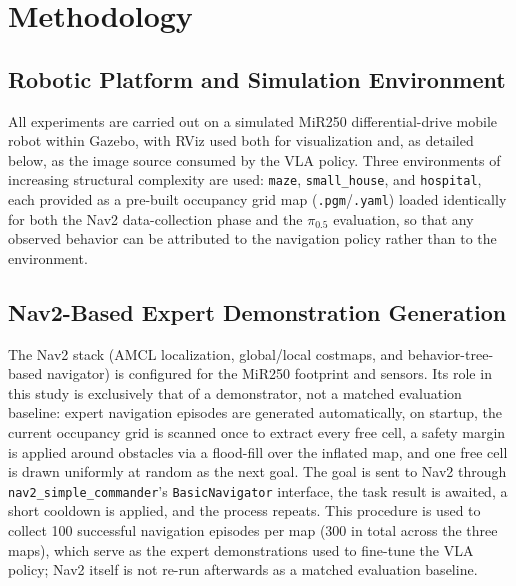 \documentclass[conference]{IEEEtran}
\begin{document}
\section{Methodology}

\subsection{Robotic Platform and Simulation Environment}
All experiments are carried out on a simulated MiR250 differential-drive mobile robot within Gazebo, with RViz used both for visualization and, as detailed below, as the image source consumed by the VLA policy. Three environments of increasing structural complexity are used: \texttt{maze}, \texttt{small\_house}, and \texttt{hospital}, each provided as a pre-built occupancy grid map (\texttt{.pgm}/\texttt{.yaml}) loaded identically for both the Nav2 data-collection phase and the $\pi_{0.5}$ evaluation, so that any observed behavior can be attributed to the navigation policy rather than to the environment.

\subsection{Nav2-Based Expert Demonstration Generation}
The Nav2 stack (AMCL localization, global/local costmaps, and behavior-tree-based navigator) is configured for the MiR250 footprint and sensors. Its role in this study is exclusively that of a demonstrator, not a matched evaluation baseline: expert navigation episodes are generated automatically, on startup, the current occupancy grid is scanned once to extract every free cell, a safety margin is applied around obstacles via a flood-fill over the inflated map, and one free cell is drawn uniformly at random as the next goal. The goal is sent to Nav2 through \texttt{nav2\_simple\_commander}'s \texttt{BasicNavigator} interface, the task result is awaited, a short cooldown is applied, and the process repeats. This procedure is used to collect 100 successful navigation episodes per map (300 in total across the three maps), which serve as the expert demonstrations used to fine-tune the VLA policy; Nav2 itself is not re-run afterwards as a matched evaluation baseline.
\end{document}

